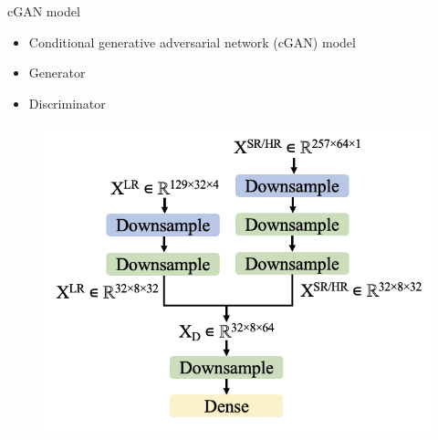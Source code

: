 \documentclass{beamer}
\begin{document}
\begin{frame}[t]{cGAN model}
    
    \begin{itemize}
        \item Conditional generative adversarial network (cGAN) model \cite{team_keras_cgan}
        \item Generator
        \hspace{0.1cm}
        \item Discriminator
    \end{itemize}


    \begin{figure}
        \centering
        \begin{minipage}{0.49\textwidth}
            \centering
            \includegraphics[height=1.0\textwidth]{MA_presentation/figures/discriminator_left.png}
        \end{minipage}
        \begin{minipage}{0.49\textwidth}
            \centering

\end{minipage}
\end{figure}
\end{frame}
\end{document}
